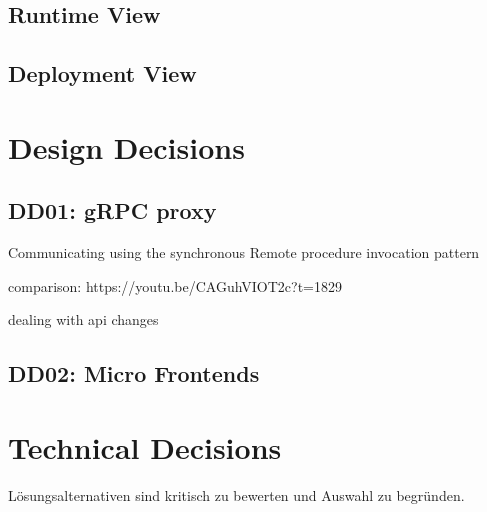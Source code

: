 \subsection{Runtime View}

\subsection{Deployment View}

\section{Design Decisions}

\subsection{DD01: gRPC proxy}

Communicating using the synchronous Remote
procedure invocation pattern \citep{richardson2018microservices}

comparison: https://youtu.be/CAGuhVIOT2c?t=1829

dealing with api changes

\subsection{DD02: Micro Frontends}

\section{Technical Decisions}

Lösungsalternativen sind kritisch zu bewerten und Auswahl zu begründen.
